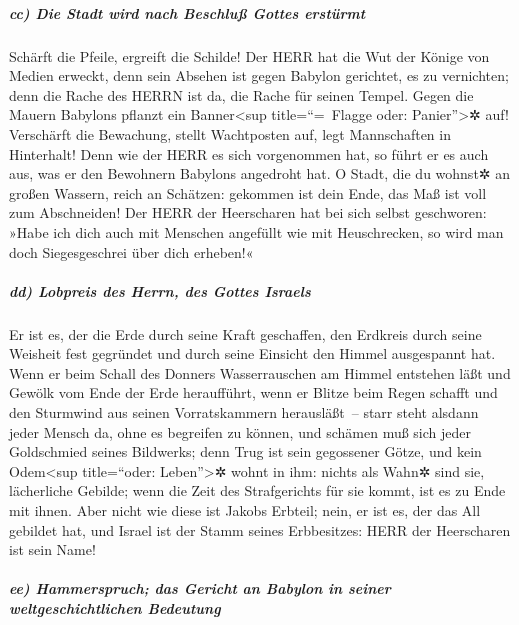 \hypertarget{cc-die-stadt-wird-nach-beschluuxdf-gottes-erstuxfcrmt}{%
\subparagraph{cc) Die Stadt wird nach Beschluß Gottes
erstürmt}\label{cc-die-stadt-wird-nach-beschluuxdf-gottes-erstuxfcrmt}}

Schärft die Pfeile, ergreift die Schilde! Der HERR hat
die Wut der Könige von Medien erweckt, denn sein Absehen ist gegen
Babylon gerichtet, es zu vernichten; denn die Rache des HERRN ist da,
die Rache für seinen Tempel. Gegen die Mauern Babylons
pflanzt ein Banner\textless sup title=``=~Flagge oder:
Panier''\textgreater✲ auf! Verschärft die Bewachung, stellt Wachtposten
auf, legt Mannschaften in Hinterhalt! Denn wie der HERR es sich
vorgenommen hat, so führt er es auch aus, was er den Bewohnern Babylons
angedroht hat. O Stadt, die du wohnst✲ an großen Wassern,
reich an Schätzen: gekommen ist dein Ende, das Maß ist voll zum
Abschneiden! Der HERR der Heerscharen hat bei sich selbst
geschworen: »Habe ich dich auch mit Menschen angefüllt wie mit
Heuschrecken, so wird man doch Siegesgeschrei über dich erheben!«

\hypertarget{dd-lobpreis-des-herrn-des-gottes-israels}{%
\subparagraph{dd) Lobpreis des Herrn, des Gottes
Israels}\label{dd-lobpreis-des-herrn-des-gottes-israels}}

Er ist es, der die Erde durch seine Kraft geschaffen, den
Erdkreis durch seine Weisheit fest gegründet und durch seine Einsicht
den Himmel ausgespannt hat. Wenn er beim Schall des
Donners Wasserrauschen am Himmel entstehen läßt und Gewölk vom Ende der
Erde heraufführt, wenn er Blitze beim Regen schafft und den Sturmwind
aus seinen Vorratskammern herausläßt~-- starr steht
alsdann jeder Mensch da, ohne es begreifen zu können, und schämen muß
sich jeder Goldschmied seines Bildwerks; denn Trug ist sein gegossener
Götze, und kein Odem\textless sup title=``oder: Leben''\textgreater✲
wohnt in ihm: nichts als Wahn✲ sind sie, lächerliche
Gebilde; wenn die Zeit des Strafgerichts für sie kommt, ist es zu Ende
mit ihnen. Aber nicht wie diese ist Jakobs Erbteil; nein,
er ist es, der das All gebildet hat, und Israel ist der Stamm seines
Erbbesitzes: HERR der Heerscharen ist sein Name!

\hypertarget{ee-hammerspruch-das-gericht-an-babylon-in-seiner-weltgeschichtlichen-bedeutung}{%
\subparagraph{ee) Hammerspruch; das Gericht an Babylon in seiner
weltgeschichtlichen
Bedeutung}\label{ee-hammerspruch-das-gericht-an-babylon-in-seiner-weltgeschichtlichen-bedeutung}}

